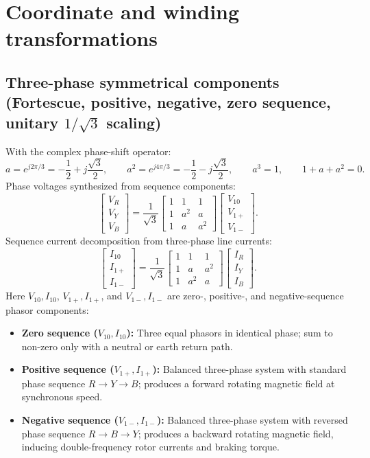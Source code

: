 \section{Coordinate and winding transformations}

\subsection{Three-phase symmetrical components (Fortescue, positive, negative, zero sequence, unitary \texorpdfstring{$1/\sqrt{3}$}{1/sqrt(3)} scaling)}
With the complex phase-shift operator:
\[
a = e^{j 2\pi/3} = -\frac{1}{2} + j\frac{\sqrt{3}}{2},
\qquad
a^2 = e^{j 4\pi/3} = -\frac{1}{2} - j\frac{\sqrt{3}}{2},
\qquad
a^3 = 1,
\qquad
1 + a + a^2 = 0.
\]
Phase voltages synthesized from sequence components:
\[
\begin{bmatrix}V_R\\V_Y\\V_B\end{bmatrix}
= \frac{1}{\sqrt{3}}
\begin{bmatrix}
1&1&1\\
1&a^2&a\\
1&a&a^2
\end{bmatrix}
\begin{bmatrix}V_{10}\\V_{1+}\\V_{1-}
\end{bmatrix}.
\]
Sequence current decomposition from three-phase line currents:
\[
\begin{bmatrix}I_{10}\\I_{1+}\\I_{1-}
\end{bmatrix}
= \frac{1}{\sqrt{3}}
\begin{bmatrix}
1&1&1\\
1&a&a^2\\
1&a^2&a
\end{bmatrix}
\begin{bmatrix}I_R\\I_Y\\I_B\end{bmatrix}.
\]
Here \(V_{10}, I_{10}\), \(V_{1+}, I_{1+}\), and \(V_{1-}, I_{1-}\) are zero-, positive-, and negative-sequence phasor components:
\begin{itemize}
  \item \textbf{Zero sequence (\(V_{10}, I_{10}\)):} Three equal phasors in identical phase; sum to non-zero only with a neutral or earth return path.
  \item \textbf{Positive sequence (\(V_{1+}, I_{1+}\)):} Balanced three-phase system with standard phase sequence \(R \to Y \to B\); produces a forward rotating magnetic field at synchronous speed.
  \item \textbf{Negative sequence (\(V_{1-}, I_{1-}\)):} Balanced three-phase system with reversed phase sequence \(R \to B \to Y\); produces a backward rotating magnetic field, inducing double-frequency rotor currents and braking torque.
\end{itemize}
